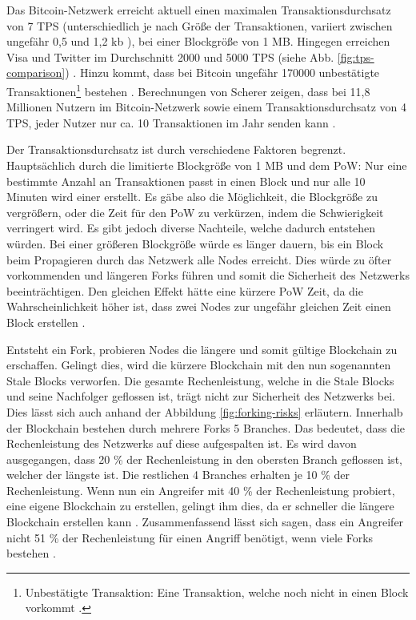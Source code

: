 Das Bitcoin-Netzwerk erreicht aktuell einen maximalen Transaktionsdurchsatz von 7 \acs{TPS} (unterschiedlich je nach Größe der Transaktionen, variiert zwischen ungefähr 0,5 und 1,2 kb \cite{Bitcoin.comTeamBitcoinTransactionSize}), bei einer Blockgröße von 1 MB. Hingegen erreichen Visa und Twitter im Durchschnitt 2000 und 5000 \acs{TPS} (siehe Abb. \ref{fig:tps-comparison}) \cite[S.~28]{SwanBlockchainblueprintnew2015}. Hinzu kommt, dass bei Bitcoin ungefähr 170000 unbestätigte Transaktionen\footnote{Unbestätigte Transaktion: Eine Transaktion, welche noch nicht in einen Block vorkommt \cite[S.~13 ff.]{AntonopoulosMasteringbitcoin2015}.} bestehen \cite{BlockchainUnternehmenUnbestatigteTransaktionenBitcoin}. Berechnungen von Scherer zeigen, dass bei 11,8 Millionen Nutzern im Bitcoin-Netzwerk sowie einem Transaktionsdurchsatz von 4 \acs{TPS}, jeder Nutzer nur ca. 10 Transaktionen im Jahr senden kann \cite{SchererPerformanceScalabilityBlockchain2017}.

Der Transaktionsdurchsatz ist durch verschiedene Faktoren begrenzt. Hauptsächlich durch die limitierte Blockgröße von 1 MB und dem \acs{PoW}: Nur eine bestimmte Anzahl an Transaktionen passt in einen Block und nur alle 10 Minuten wird einer erstellt. Es gäbe also die Möglichkeit, die Blockgröße zu vergrößern, oder die Zeit für den \acs{PoW} zu verkürzen, indem die Schwierigkeit verringert wird. Es gibt jedoch diverse Nachteile, welche dadurch entstehen würden. Bei einer größeren Blockgröße würde es länger dauern, bis ein Block beim Propagieren durch das Netzwerk alle Nodes erreicht. Dies würde zu öfter vorkommenden und längeren Forks führen und somit die Sicherheit des Netzwerks beeinträchtigen. Den gleichen Effekt hätte eine kürzere \acs{PoW} Zeit, da die Wahrscheinlichkeit höher ist, dass zwei Nodes zur ungefähr gleichen Zeit einen Block erstellen \cite{SchererPerformanceScalabilityBlockchain2017}\cite{EthereumTeamEthereumWhitePaper2017}\cite{SompolinskyAcceleratingBitcoinTransaction2013}. 

Entsteht ein Fork, probieren Nodes die längere und somit gültige Blockchain zu erschaffen. Gelingt dies, wird die kürzere Blockchain mit den nun sogenannten Stale Blocks verworfen. Die gesamte Rechenleistung, welche in die Stale Blocks und seine Nachfolger geflossen ist, trägt nicht zur Sicherheit des Netzwerks bei. Dies lässt sich auch anhand der Abbildung \ref{fig:forking-risks} erläutern. Innerhalb der Blockchain bestehen durch mehrere Forks 5 Branches. Das bedeutet, dass die Rechenleistung des Netzwerks auf diese aufgespalten ist. Es wird davon ausgegangen, dass 20 \% der Rechenleistung in den obersten Branch geflossen ist, welcher der längste ist. Die restlichen 4 Branches erhalten je 10 \% der Rechenleistung. Wenn nun ein Angreifer mit 40 \% der Rechenleistung probiert, eine eigene Blockchain zu erstellen, gelingt ihm dies, da er schneller die längere Blockchain erstellen kann \cite{SompolinskyAcceleratingBitcoinTransaction2013}. Zusammenfassend lässt sich sagen, dass ein Angreifer nicht 51 \% der Rechenleistung für einen Angriff benötigt, wenn viele Forks bestehen \cite{Buterin12secondBlockTime2014}. 

